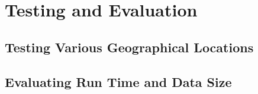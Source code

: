 \chapter{Testing and Evaluation}
\label{chapter:testing-and-evaluation}


\section{Testing Various Geographical Locations}


\section{Evaluating Run Time and Data Size}

